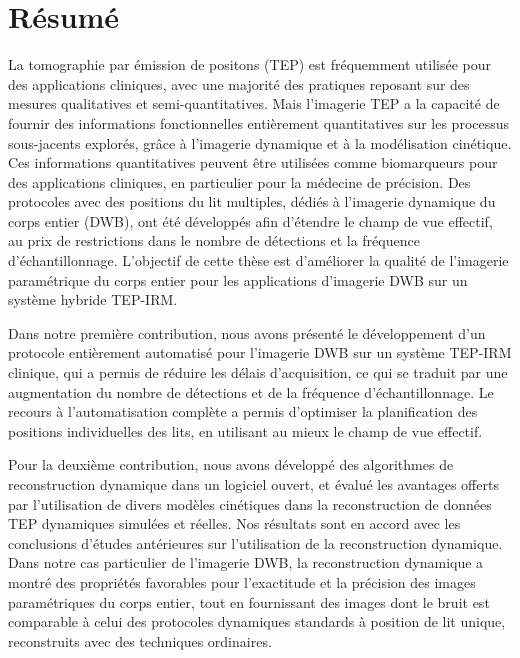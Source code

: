 \section*{Résumé}
La tomographie par émission de positons (TEP) est fréquemment utilisée pour des applications cliniques, avec une majorité des pratiques reposant sur des mesures qualitatives et semi-quantitatives. Mais l'imagerie TEP a la capacité de fournir des informations fonctionnelles entièrement quantitatives sur les processus sous-jacents explorés, grâce à l'imagerie dynamique et à la modélisation cinétique. Ces informations quantitatives peuvent être utilisées comme biomarqueurs pour des applications cliniques, en particulier pour la médecine de précision. Des protocoles avec des positions du lit multiples, dédiés à l'imagerie dynamique du corps entier (DWB), ont été développés afin d'étendre le champ de vue effectif, au prix de restrictions dans le nombre de détections et la fréquence d'échantillonnage. L'objectif de cette thèse est d'améliorer la qualité de l'imagerie paramétrique du corps entier pour les applications d'imagerie DWB sur un système hybride TEP-IRM.

Dans notre première contribution, nous avons présenté le développement d'un protocole entièrement automatisé pour l'imagerie DWB sur un système TEP-IRM clinique, qui a permis de réduire les délais d'acquisition, ce qui se traduit par une augmentation du nombre de détections et de la fréquence d'échantillonnage. Le recours à l'automatisation complète a permis d'optimiser la planification des positions individuelles des lits, en utilisant au mieux le champ de vue effectif. 

Pour la deuxième contribution, nous avons développé des algorithmes de reconstruction dynamique dans un logiciel ouvert, et évalué les avantages offerts par l'utilisation de divers modèles cinétiques dans la reconstruction de données TEP dynamiques simulées et réelles. 
Nos résultats sont en accord avec les conclusions d’études antérieures sur l'utilisation de la reconstruction dynamique. Dans notre cas particulier de l'imagerie DWB, la reconstruction dynamique a montré des propriétés favorables pour l'exactitude et la précision des images paramétriques du corps entier, tout en fournissant des images dont le bruit est comparable à celui des protocoles dynamiques standards à position de lit unique, reconstruits avec des techniques ordinaires.

